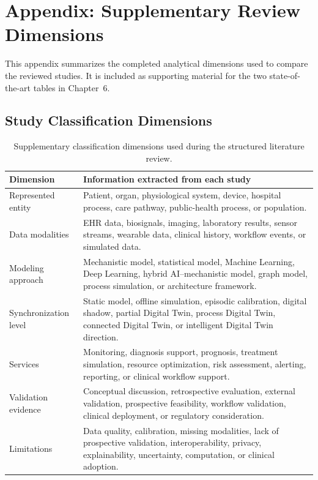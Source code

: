 \chapter{Appendix: Supplementary Review Dimensions}

This appendix summarizes the completed analytical dimensions used to compare the reviewed studies. It is included as supporting material for the two state-of-the-art tables in Chapter~6.

\section{Study Classification Dimensions}
\begin{table}[H]
\centering
\small
\caption{Supplementary classification dimensions used during the structured literature review.}
\label{tab:appendix_review_dimensions}
\begin{tabularx}{\textwidth}{>{\RaggedRight\arraybackslash}p{4.0cm} X}
\toprule
\textbf{Dimension} & \textbf{Information extracted from each study}\\
\midrule
Represented entity & Patient, organ, physiological system, device, hospital process, care pathway, public-health process, or population.\\
Data modalities & EHR data, biosignals, imaging, laboratory results, sensor streams, wearable data, clinical history, workflow events, or simulated data.\\
Modeling approach & Mechanistic model, statistical model, Machine Learning, Deep Learning, hybrid AI--mechanistic model, graph model, process simulation, or architecture framework.\\
Synchronization level & Static model, offline simulation, episodic calibration, digital shadow, partial Digital Twin, process Digital Twin, connected Digital Twin, or intelligent Digital Twin direction.\\
Services & Monitoring, diagnosis support, prognosis, treatment simulation, resource optimization, risk assessment, alerting, reporting, or clinical workflow support.\\
Validation evidence & Conceptual discussion, retrospective evaluation, external validation, prospective feasibility, workflow validation, clinical deployment, or regulatory consideration.\\
Limitations & Data quality, calibration, missing modalities, lack of prospective validation, interoperability, privacy, explainability, uncertainty, computation, or clinical adoption.\\
\bottomrule
\end{tabularx}
\end{table}


